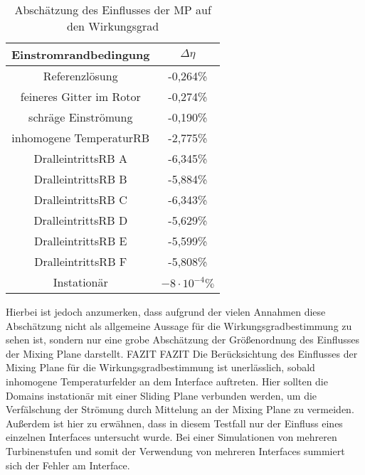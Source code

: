 \begin{table}[H]
\centering
\caption{Abschätzung des Einflusses der MP auf den Wirkungsgrad}
\begin{tabular}{ c| c}
Einstromrandbedingung&$\Delta \eta$\\
\toprule
Referenzlösung&-0,264\%\\
feineres Gitter im Rotor&-0,274\%\\
schräge Einströmung&-0,190\% \\
inhomogene TemperaturRB&-2,775\% \\
DralleintrittsRB A&-6,345\% \\
DralleintrittsRB B&-5,884\% \\
DralleintrittsRB C&-6,343\% \\
DralleintrittsRB D&-5,629\% \\
DralleintrittsRB E&-5,599\% \\
DralleintrittsRB F&-5,808\% \\
\midrule
Instationär&$-8 \cdot 10^{-4}\%$ \\
\end{tabular}
\label{tab:kanalwg}
\end{table}
Hierbei ist jedoch anzumerken, dass aufgrund der vielen Annahmen diese Abschätzung nicht als allgemeine Aussage für die Wirkungsgradbestimmung zu sehen ist, sondern nur eine grobe Abschätzung der Größenordnung des Einflusses der Mixing Plane darstellt.
FAZIT FAZIT
Die Berücksichtung des Einflusses der Mixing Plane für die Wirkungsgradbestimmung ist unerlässlich, sobald inhomogene Temperaturfelder an dem Interface auftreten. Hier sollten die Domains instationär mit einer Sliding Plane verbunden werden, um die Verfälschung der Strömung durch Mittelung an der Mixing Plane zu vermeiden. Außerdem ist hier zu erwähnen, dass in diesem Testfall nur der Einfluss eines einzelnen Interfaces untersucht wurde. Bei einer Simulationen von mehreren Turbinenstufen und somit der Verwendung von mehreren Interfaces summiert sich der Fehler am Interface.



